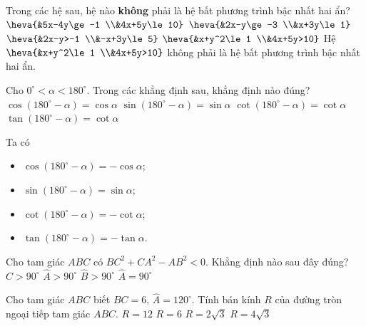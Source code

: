 \begin{ex}%
Trong các hệ sau, hệ nào \textbf{không} phải là hệ bất phương trình bậc nhất hai ẩn?
\choice
{$\heva{&5x-4y\ge -1 \\&4x+5y\le 10}$}
{$\heva{&2x-y\ge -3 \\&x+3y\le 1}$}
{$\heva{&2x-y>-1 \\&-x+3y\le 5}$}
{\True $\heva{&x+y^2\le 1 \\&4x+5y>10}$}
\loigiai
{Hệ $\heva{&x+y^2\le 1 \\&4x+5y>10}$ không phải là hệ bất phương trình bậc nhất hai ẩn.}
\end{ex}

\begin{ex}%
Cho $0^\circ <\alpha<180^\circ$. Trong các khẳng định sau, khẳng định nào đúng?
\choice
{$\cos (180^\circ -\alpha)=\cos \alpha$}
{\True $\sin (180^\circ -\alpha)=\sin \alpha$}
{$\cot (180^\circ -\alpha)=\cot \alpha$}
{$\tan (180^\circ -\alpha)=\cot \alpha$}
\loigiai
{Ta có
\begin{itemize}
\item $\cos (180^\circ -\alpha)=-\cos \alpha$;
\item $\sin (180^\circ -\alpha)=\sin \alpha$;
\item $\cot (180^\circ -\alpha)=-\cot \alpha$;
\item $\tan (180^\circ -\alpha)=-\tan \alpha$.
\end{itemize}
}
\end{ex}
\begin{ex}%
Cho tam giác $ABC$ có $BC^2 + CA^2 - AB^2 < 0$. Khẳng định nào sau đây đúng?
\choice
{\True $\widehat{C}>90^\circ$}
{$\widehat{A}>90^\circ$}
{$\widehat{B}>90^\circ$}
{$\widehat{A}=90^\circ$}
\end{ex}

\begin{ex}%
Cho tam giác $ABC$ biết $BC = 6$, $\widehat{A}=120^\circ$. Tính bán kính $R$ của đường tròn ngoại tiếp tam giác $ABC$.
\choice
{$R=12$}
{$R=6$}
{\True $R=2\sqrt{3}$}
{$R=4\sqrt{3}$}
\end{ex}

